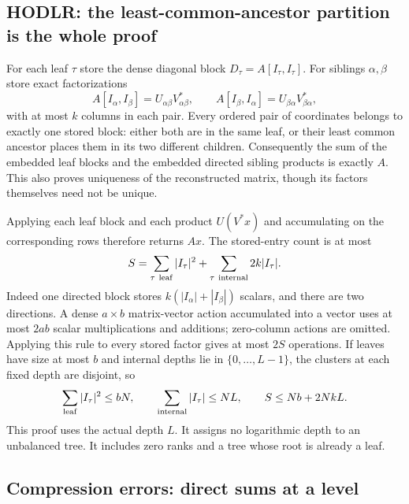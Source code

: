 \documentclass[11pt,a4paper]{article}
\begin{document}
\subsection{HODLR: the least-common-ancestor partition is the whole proof}

For each leaf $\tau$ store the dense diagonal block
$D_\tau=A[I_\tau,I_\tau]$. For siblings $\alpha,\beta$ store exact
factorizations
\[
 A[I_\alpha,I_\beta]=U_{\alpha\beta}V_{\alpha\beta}^*,\qquad
 A[I_\beta,I_\alpha]=U_{\beta\alpha}V_{\beta\alpha}^*,
\]
with at most $k$ columns in each pair. Every ordered pair of coordinates
belongs to exactly one stored block: either both are in the same leaf,
or their least common ancestor places them in its two different children.
Consequently the sum of the embedded leaf blocks and the embedded
directed sibling products is exactly $A$. This also proves uniqueness
of the reconstructed matrix, though its factors themselves need not be
unique.

Applying each leaf block and each product $U(V^*x)$ and accumulating on
the corresponding rows therefore returns $Ax$. The stored-entry count
is at most
\[
 S=\sum_{\tau\ {\rm leaf}}|I_\tau|^2
       +\sum_{\tau\ {\rm internal}}2k|I_\tau|.
\]
Indeed one directed block stores $k(|I_\alpha|+|I_\beta|)$ scalars,
and there are two directions. A dense $a\times b$ matrix-vector action
accumulated into a vector uses at most $2ab$ scalar multiplications and
additions; zero-column actions are omitted. Applying this rule to every
stored factor gives at most $2S$ operations. If leaves have size at most
$b$ and internal depths lie in $\{0,\ldots,L-1\}$, the clusters at each
fixed depth are disjoint, so
\[
 \sum_{\rm leaf}|I_\tau|^2\le bN,\qquad
 \sum_{\rm internal}|I_\tau|\le NL,\qquad
 S\le Nb+2NkL.
\]
This proof uses the actual depth $L$. It assigns no logarithmic depth to
an unbalanced tree. It includes zero ranks and a tree whose root is
already a leaf.

\subsection{Compression errors: direct sums at a level}
\end{document}
